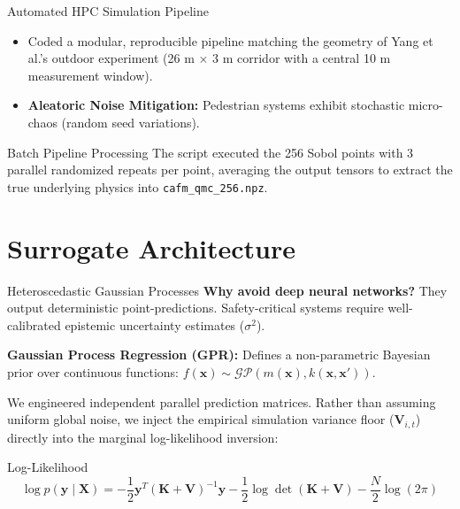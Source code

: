 \documentclass[aspectratio=169]{beamer}
\begin{document}
\begin{frame}{Automated HPC Simulation Pipeline}
    \begin{itemize}
        \item Coded a modular, reproducible pipeline matching the geometry of Yang et al.'s outdoor experiment (26 m $\times$ 3 m corridor with a central 10 m measurement window).
        \item \textbf{Aleatoric Noise Mitigation:} Pedestrian systems exhibit stochastic micro-chaos (random seed variations).
    \end{itemize}

    \vspace{0.4cm}
    \begin{block}{Batch Pipeline Processing}
        The script executed the 256 Sobol points with 3 parallel randomized repeats per point, averaging the output tensors to extract the true underlying physics into \texttt{cafm\_qmc\_256.npz}.
    \end{block}
\end{frame}

\section{Surrogate Architecture}

\begin{frame}{Heteroscedastic Gaussian Processes}
    \textbf{Why avoid deep neural networks?} They output deterministic point-predictions. Safety-critical systems require well-calibrated epistemic uncertainty estimates ($\sigma^2$).

    \vspace{0.2cm}
    \textbf{Gaussian Process Regression (GPR):} Defines a non-parametric Bayesian prior over continuous functions: $f(\mathbf{x}) \sim \mathcal{GP}(m(\mathbf{x}), k(\mathbf{x}, \mathbf{x}'))$.

    \vspace{0.2cm}
    We engineered independent parallel prediction matrices. Rather than assuming uniform global noise, we inject the empirical simulation variance floor ($\mathbf{V}_{i,t}$) directly into the marginal log-likelihood inversion:

    \begin{block}{Log-Likelihood}
    \[
    \log p(\mathbf{y} \mid \mathbf{X}) = -\frac{1}{2}\mathbf{y}^T(\mathbf{K} + \mathbf{V})^{-1}\mathbf{y} - \frac{1}{2}\log\det(\mathbf{K} + \mathbf{V}) - \frac{N}{2}\log(2\pi)
    \]
    \end{block}
\end{frame}
\end{document}
